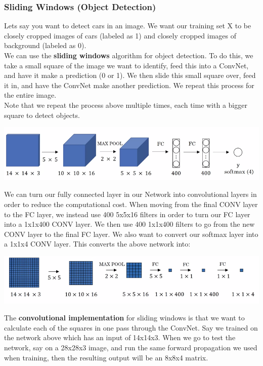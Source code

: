 \documentclass[11pt, a4paper]{article}
\begin{document}
\begin{spacing}{1.1}
	\subsubsection{Sliding Windows (Object Detection)}
	Lets say you want to detect cars in an image. We want our training set X to be closely cropped images of cars (labeled as 1) and closely cropped images of background (labeled as 0). \vspace*{2mm}\\
	We can use the \textbf{sliding windows} algorithm for object detection. To do this, we take a small square of the image we want to identify, feed this into a ConvNet, and have it make a prediction (0 or 1). We then slide this small square over, feed it in, and have the ConvNet make another prediction. We repeat this process for the entire image. \vspace*{1mm} \\
	Note that we repeat the process above multiple times, each time with a bigger square to detect objects.
	\begin{center}	\includegraphics[scale=.7]{slid_wind}	\end{center}
	We can turn our fully connected layer in our Network into convolutional layers in order to reduce the computational cost. When moving from the final CONV layer to the FC layer, we instead use 400 5x5x16 filters in order to turn our FC layer into a 1x1x400 CONV layer. We then use 400 1x1x400 filters to go from the new CONV layer to the final FC layer. We also want to convert our softmax layer into a 1x1x4 CONV layer. This converts the above network into:
	\begin{center}	\includegraphics[scale=.7]{slid_wind_2}	\end{center}
	The \textbf{convolutional implementation} for sliding windows is that we want to calculate each of the squares in one pass through the ConvNet. Say we trained on the network above which has an input of 14x14x3. When we go to test the network, say on a 28x28x3 image, and run the same forward propagation we used when training, then the resulting output will be an 8x8x4 matrix.

\end{spacing}
\end{document}
